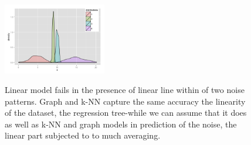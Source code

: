 \documentclass[a4paper]{article}
\begin{document}
\begin{figure}[H]
{    \includegraphics[width=0.4\textwidth]{IVd}
    \label{fig:subfig2}
}
\caption[Optional caption for list of figures]{
Linear model fails in the presence of linear line within of two noise patterns.
Graph and k-NN capture the same accuracy the linearity of the dataset, the regression tree-while we can assume that it does as well as k-NN and graph models in prediction of the noise, the linear part subjected to to much averaging. }




\end{figure}
\end{document}
